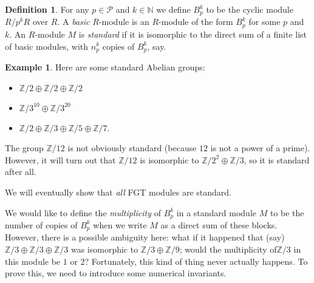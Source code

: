 \documentclass{amsart}
\newcommand{\Z}         {{\mathbb{Z}}}
\newcommand{\CP}        {{\mathcal{P}}}
\newcommand{\N}         {{\mathbb{N}}}
\newcommand{\op}        {\oplus}
\renewcommand{\:}{\colon}
\theoremstyle{definition}
\newtheorem{definition}[theorem]{Definition}
\newtheorem{example}[theorem]{Example}
\begin{document}
\begin{definition}
 For any $p\in\CP$ and $k\in\N$ we define $B_p^k$ to be the cyclic
 module $R/p^kR$ over $R$.  A \emph{basic} $R$-module is an $R$-module
 of the form $B_p^k$ for some $p$ and $k$.  An $R$-module $M$ is
 \emph{standard} if it is isomorphic to the direct sum of a finite
 list of basic modules, with $n_p^k$ copies of $B_p^k$, say.
\end{definition}
\begin{example}
 Here are some standard Abelian groups:
 \begin{itemize}
 \item $\Z/2 \op \Z/2 \op \Z/2$
 \item $\Z/3^{10} \op \Z/3^{20}$
 \item $\Z/2 \op \Z/3 \op \Z/5 \op \Z/7$.
 \end{itemize}
 The group $\Z/12$ is not obviously standard (because $12$ is not a
 power of a prime).  However, it will turn out that $\Z/12$ is
 isomorphic to $\Z/2^2\op\Z/3$, so it is standard after all.
\end{example}
We will eventually show that \emph{all} FGT modules are standard.

We would like to define the \emph{multiplicity} of $B_p^k$ in a
standard module $M$ to be the number of copies of $B_p^k$ when we
write $M$ as a direct sum of these blocks.  However, there is a
possible ambiguity here: what if it happened that (say)
$\Z/3\op\Z/3\op\Z/3$ was isomorphic to $\Z/3\op\Z/9$; would the
multiplicity of$\Z/3$ in this module be $1$ or $2$?  Fortunately, this
kind of thing never actually happens.  To prove this, we need to
introduce some numerical invariants.
\end{document}
